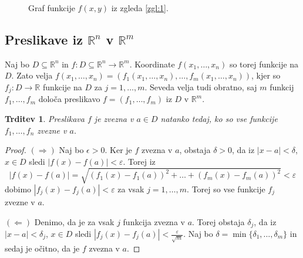 \documentclass[10pt, a4paper]{article}
\newtheorem{trditev}[izr]{Trditev}
\newenvironment{noticeC}{%
  \tcolorbox[%
  notitle,
  empty,
  enhanced,  %
  breakable,
  coltext=black, 
  fontupper=\rmfamily,
  parbox=false,
  noparskip,
  sharp corners,
  boxrule=-1pt,  %
  frame hidden,
  left=7pt,  %
  right=7pt,
  top=5pt,
  bottom=5pt,
  before skip=2.5ex plus 2pt,
  after skip=2.5ex plus 2pt,
  overlay unbroken and last={%
  },
  ]}
{\endtcolorbox}
\newenvironment{dokaz}%
  {\begin{noticeC}\begin{proof}}%
  {\end{proof}\end{noticeC}}
\newcommand{\R}{\mathbb {R}}
\begin{document}
\begin{figure}
    \centering
    \caption{Graf funkcije $f(x, y)$ iz zgleda \ref{zgl:1}.}
\end{figure}

\subsection{Preslikave iz $\R^n$ v $\R^m$}

Naj bo $D \subseteq \R^n$ in $f: D \subseteq \R^n \rightarrow \R^m$.
Koordinate $f(x_1, \dots, x_n)$ so torej funkcije na $D$. Zato velja 
$f(x_1, \dots, x_n) = (f_1 (x_1, \dots, x_n), \dots, f_m (x_1, \dots, x_n))$,
kjer so $f_j : D \rightarrow \R$ funkcije na $D$ za $j = 1, \dots, m$.
Seveda velja tudi obratno, saj $m$ funkcij $f_1, \dots, f_m$
določa preslikavo $f = (f_1, \dots, f_m)$ iz $D$ v $\R^m$.

\begin{trditev}
    Preslikava $f$ je zvezna v $a \in D$ natanko tedaj, ko so vse funkcije $f_1, \dots, f_n$ zvezne v $a$.
\end{trditev}

\begin{dokaz}
    $(\Rightarrow)$ Naj bo $\epsilon > 0.$
    Ker je $f$ zvezna v $a$, obstaja $\delta > 0$, da iz 
    $|x - a| < \delta$, $x \in D$ sledi $|f(x) - f(a)| < \varepsilon$.
    Torej iz $$|f(x) - f(a)| = \sqrt{(f_1 (x) - f_1 (a))^2 + \dots + (f_m (x) - f_m (a))^2} < \varepsilon$$
    dobimo $|f_j (x) - f_j (a)| < \varepsilon$ za vsak $j = 1, \dots, m$.
    Torej so vse funkcije $f_j$ zvezne v $a$.

    $(\Leftarrow)$ Denimo, da je za vsak $j$ funkcija zvezna v $a$.
    Torej obstaja $\delta_j$, da iz $|x - a| < \delta_j$, $x \in D$
    sledi $|f_j (x) - f_j (a)| < \frac{\varepsilon}{\sqrt{m}}$.
    Naj bo $\delta = \min \{\delta_1, \dots, \delta_m\}$ in sedaj je očitno,
    da je $f$ zvezna v $a$.
\end{dokaz}
\end{document}
